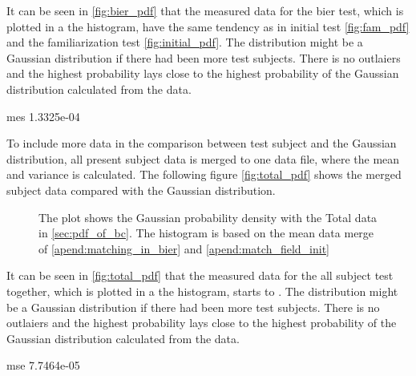 It can be seen in \autoref{fig:bier_pdf} that the measured data for the \gls{bier} test, which is plotted in a the histogram, have the same tendency as in initial test \autoref{fig:fam_pdf} and the familiarization test \autoref{fig:initial_pdf}. The distribution might be a Gaussian distribution if there had been more test subjects. There is no outlaiers and the highest probability lays close to the highest probability of the Gaussian distribution calculated from the data. 

mes 1.3325e-04

To include more data in the comparison between test subject and the Gaussian distribution, all present subject data is merged to one data file, where the mean and variance is calculated. The following figure \autoref{fig:total_pdf} shows the merged subject data compared with the Gaussian distribution.

 \begin{figure}[H]
	\centering
	
		\caption{The plot shows the Gaussian probability density with the Total data in \autoref{sec:pdf_of_bc}. The histogram is based on the mean data merge of \autoref{apend:matching_in_bier} and \autoref{apend:match_field_init}}
		\label{fig:total_pdf}
\end{figure}

It can be seen in \autoref{fig:total_pdf} that the measured data for the all subject test together, which is plotted in a the histogram, starts to . The distribution might be a Gaussian distribution if there had been more test subjects. There is no outlaiers and the highest probability lays close to the highest probability of the Gaussian distribution calculated from the data. 

mse 7.7464e-05